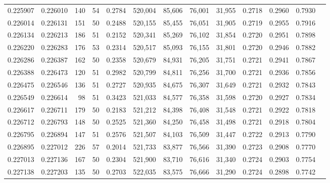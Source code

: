 \begin{tabular}{rrrrrrrrrrrrr}
0.225907 & 0.226010 &   140 &  54 &                                     0.2784 & 520,004 &  85,606 &  76,001 &  31,955 & 0.2718 & 0.2960 & 0.7930 \\
0.226014 & 0.226131 &   151 &  50 &                                     0.2488 & 520,155 &  85,455 &  76,051 &  31,905 & 0.2719 & 0.2955 & 0.7916 \\
0.226134 & 0.226213 &   186 &  51 &                                     0.2152 & 520,341 &  85,269 &  76,102 &  31,854 & 0.2720 & 0.2951 & 0.7898 \\
0.226220 & 0.226283 &   176 &  53 &                                     0.2314 & 520,517 &  85,093 &  76,155 &  31,801 & 0.2720 & 0.2946 & 0.7882 \\
0.226286 & 0.226387 &   162 &  50 &                                     0.2358 & 520,679 &  84,931 &  76,205 &  31,751 & 0.2721 & 0.2941 & 0.7867 \\
0.226388 & 0.226473 &   120 &  51 &                                     0.2982 & 520,799 &  84,811 &  76,256 &  31,700 & 0.2721 & 0.2936 & 0.7856 \\
0.226475 & 0.226546 &   136 &  51 &                                     0.2727 & 520,935 &  84,675 &  76,307 &  31,649 & 0.2721 & 0.2932 & 0.7843 \\
0.226549 & 0.226614 &    98 &  51 &                                     0.3423 & 521,033 &  84,577 &  76,358 &  31,598 & 0.2720 & 0.2927 & 0.7834 \\
0.226617 & 0.226711 &   179 &  50 &                                     0.2183 & 521,212 &  84,398 &  76,408 &  31,548 & 0.2721 & 0.2922 & 0.7818 \\
0.226712 & 0.226793 &   148 &  50 &                                     0.2525 & 521,360 &  84,250 &  76,458 &  31,498 & 0.2721 & 0.2918 & 0.7804 \\
0.226795 & 0.226894 &   147 &  51 &                                     0.2576 & 521,507 &  84,103 &  76,509 &  31,447 & 0.2722 & 0.2913 & 0.7790 \\
0.226895 & 0.227012 &   226 &  57 &                                     0.2014 & 521,733 &  83,877 &  76,566 &  31,390 & 0.2723 & 0.2908 & 0.7770 \\
0.227013 & 0.227136 &   167 &  50 &                                     0.2304 & 521,900 &  83,710 &  76,616 &  31,340 & 0.2724 & 0.2903 & 0.7754 \\
0.227138 & 0.227203 &   135 &  50 &                                     0.2703 & 522,035 &  83,575 &  76,666 &  31,290 & 0.2724 & 0.2898 & 0.7742 \\

\end{tabular}
